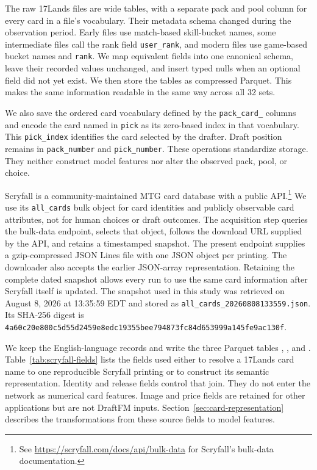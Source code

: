 \documentclass[11pt]{article}
\numberwithin{equation}{section}
\begin{document}
The raw 17Lands files are wide tables, with a separate pack and pool column for
every card in a file's vocabulary. Their metadata schema changed during the
observation period. Early files use match-based skill-bucket names, some
intermediate files call the rank field \texttt{user\_rank}, and modern files
use game-based bucket names and \texttt{rank}. We map equivalent fields into
one canonical schema, leave their recorded values unchanged, and insert typed
nulls when an optional field did not yet exist. We then store the tables as
compressed Parquet. This makes the same information readable in the same way
across all 32 sets.

We also save the ordered card vocabulary defined by the
\texttt{pack\_card\_} columns and encode the card named in \texttt{pick} as its
zero-based index in that vocabulary. This \texttt{pick\_index} identifies the
card selected by the drafter. Draft position remains in \texttt{pack\_number}
and \texttt{pick\_number}. These operations standardize storage. They neither
construct model features nor alter the observed pack, pool, or choice.

Scryfall is a community-maintained MTG card database with a public
API.\footnote{See \url{https://scryfall.com/docs/api/bulk-data} for Scryfall's
bulk-data documentation.} We use its
\texttt{all\_cards} bulk object for card identities and publicly observable card
attributes, not for human choices or draft outcomes.
The acquisition step queries the bulk-data endpoint,
selects that object, follows the download URL supplied by the API, and retains
a timestamped snapshot. The present endpoint supplies a gzip-compressed
JSON Lines file with one JSON object per printing. The downloader also accepts
the earlier JSON-array representation. Retaining the complete dated snapshot
allows every run to use the same card information after Scryfall itself is
updated. The snapshot used in this study was retrieved on August 8,
2026 at 13:35:59 EDT and stored as
\texttt{all\_cards\_20260808133559.json}. Its SHA-256 digest is
\texttt{4a60c20e800c5d55d2459e8edc19355bee794873fc84d653999a145fe9ac130f}.

We keep the English-language records and write the three Parquet tables
, , and .
Table~\ref{tab:scryfall-fields} lists the fields used
either to resolve a 17Lands card name to one reproducible Scryfall printing or
to construct its semantic representation. Identity and release fields control
that join. They do not enter the network as numerical card features. Image and
price fields are retained for other applications but are not DraftFM inputs.
Section~\ref{sec:card-representation} describes the transformations from these
source fields to model features.
\end{document}
